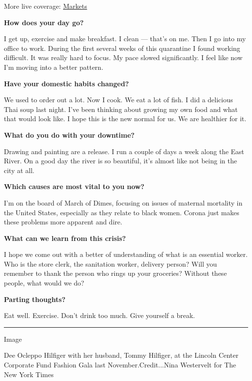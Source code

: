 More live coverage:
\href{https://www.nytimes.com/live/2020/08/03/business/stock-market-today-coronavirus?action=click\&pgtype=Article\&state=default\&region=MAIN_CONTENT_1\&context=storylines_live_updates}{Markets}

\textbf{How does your day go?}

I get up, exercise and make breakfast. I clean --- that's on me. Then I
go into my office to work. During the first several weeks of this
quarantine I found working difficult. It was really hard to focus. My
pace slowed significantly. I feel like now I'm moving into a better
pattern.

\textbf{Have your domestic habits changed?}

We used to order out a lot. Now I cook. We eat a lot of fish. I did a
delicious Thai soup last night. I've been thinking about growing my own
food and what that would look like. I hope this is the new normal for
us. We are healthier for it.

\textbf{What do you do with your downtime?}

Drawing and painting are a release. I run a couple of days a week along
the East River. On a good day the river is so beautiful, it's almost
like not being in the city at all.

\textbf{Which causes are most vital to you now?}

I'm on the board of March of Dimes, focusing on issues of maternal
mortality in the United States, especially as they relate to black
women. Corona just makes these problems more apparent and dire.

\textbf{What can we learn from this crisis?}

I hope we come out with a better of understanding of what is an
essential worker. Who is the store clerk, the sanitation worker,
delivery person? Will you remember to thank the person who rings up your
groceries? Without these people, what would we do?

\textbf{Parting thoughts?}

Eat well. Exercise. Don't drink too much. Give yourself a break.

\begin{center}\rule{0.5\linewidth}{\linethickness}\end{center}

Image

Dee Ocleppo Hilfiger with her husband, Tommy Hilfiger, at the Lincoln
Center Corporate Fund Fashion Gala last November.Credit...Nina
Westervelt for The New York Times

